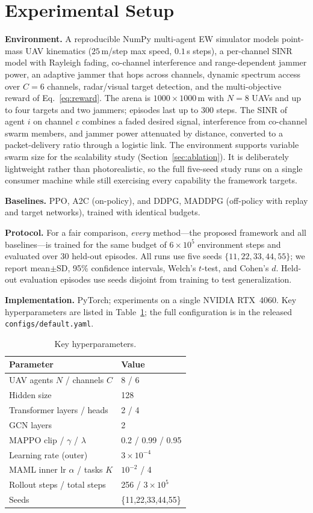 \documentclass[journal]{IEEEtran}
\begin{document}
\section{Experimental Setup}
\textbf{Environment.} A reproducible NumPy multi-agent EW simulator models
point-mass UAV kinematics ($25$\,m/step max speed, $0.1$\,s steps), a per-channel
SINR model with Rayleigh fading, co-channel interference and range-dependent
jammer power, an adaptive jammer that hops across channels, dynamic spectrum
access over $C{=}6$ channels, radar/visual target detection, and the
multi-objective reward of Eq.~\eqref{eq:reward}. The arena is
$1000\times1000$\,m with $N{=}8$ UAVs and up to four targets and two jammers;
episodes last up to $300$ steps. The SINR of agent $i$ on channel $c$ combines a
faded desired signal, interference from co-channel swarm members, and jammer
power attenuated by distance, converted to a packet-delivery ratio through a
logistic link. The environment supports variable swarm size for the scalability
study (Section~\ref{sec:ablation}). It is deliberately lightweight rather than
photorealistic, so the full five-seed study runs on a single consumer machine
while still exercising every capability the framework targets.

\textbf{Baselines.} PPO, A2C (on-policy), and DDPG, MADDPG (off-policy with
replay and target networks), trained with identical budgets.

\textbf{Protocol.} For a fair comparison, \emph{every} method---the proposed
framework and all baselines---is trained for the same budget of $6\times10^5$
environment steps and evaluated over 30 held-out episodes. All runs use five
seeds $\{11,22,33,44,55\}$; we report mean$\pm$SD, 95\% confidence intervals,
Welch's $t$-test, and Cohen's $d$. Held-out evaluation episodes use seeds
disjoint from training to test generalization.

\textbf{Implementation.} PyTorch; experiments on a single NVIDIA RTX~4060.
Key hyperparameters are listed in Table~\ref{tab:hyper}; the full configuration
is in the released \texttt{configs/default.yaml}.

\begin{table}[!t]
\centering
\caption{Key hyperparameters.}
\label{tab:hyper}
\begin{tabular}{ll}
\hline
Parameter & Value \\ \hline
UAV agents $N$ / channels $C$ & 8 / 6 \\
Hidden size & 128 \\
Transformer layers / heads & 2 / 4 \\
GCN layers & 2 \\
MAPPO clip / $\gamma$ / $\lambda$ & 0.2 / 0.99 / 0.95 \\
Learning rate (outer) & $3\times10^{-4}$ \\
MAML inner lr $\alpha$ / tasks $K$ & $10^{-2}$ / 4 \\
Rollout steps / total steps & 256 / $3\times10^5$ \\
Seeds & \{11,22,33,44,55\} \\ \hline
\end{tabular}
\end{table}
\end{document}
